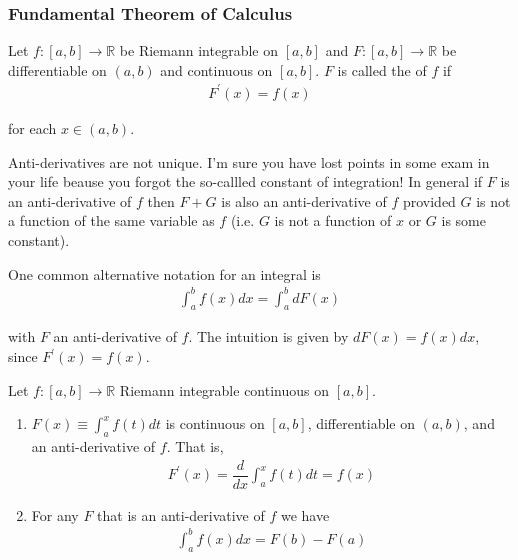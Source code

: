 \documentclass{article}
\begin{document}
\subsubsection{Fundamental Theorem of Calculus}
\label{ssub:fundamental_theorem_of_calculus}

\begin{definition}
  Let $f: [a, b] \to \mathbb{R}$ be Riemann integrable on $[a, b]$ and $F: [a, b] \to \mathbb{R}$ be differentiable on $(a, b)$ and continuous on $[a, b]$. $F$ is called the  of $f$ if
  \begin{align*}
    F^{\prime}(x) = f(x)
  \end{align*}

  for each $x \in (a, b)$.
\end{definition}

\begin{remark}
  Anti-derivatives are not unique. I'm sure you have lost points in some exam in your life beause you forgot the so-callled constant of integration! In general if $F$ is an anti-derivative of $f$ then $F + G$ is also an anti-derivative of $f$ provided $G$ is not a function of the same variable as $f$ (i.e. $G$ is not a function of $x$ or $G$ is some constant).
\end{remark}

\begin{remark}
  One common alternative notation for an integral is
  \begin{align*}
    \int_{a}^{b} f(x) dx
    =
    \int_{a}^{b} dF(x)
  \end{align*}

  with $F$ an anti-derivative of $f$. The intuition is given by $dF(x) = f(x) dx$, since $F^\prime(x) = f(x)$.
\end{remark}

\begin{theorem}
  Let $f: [a, b] \to \mathbb{R}$ Riemann integrable continuous on $[a, b]$.
  \begin{enumerate}
    \item $F(x) \equiv \displaystyle\int_a^x f(t) dt$ is continuous on $[a, b]$, differentiable on $(a, b)$, and an anti-derivative of $f$. That is,
      \begin{align*}
        F^{\prime}(x) = \dfrac{d}{dx} \int_{a}^{x} f(t) dt = f(x)
      \end{align*}

    \item For any $F$ that is an anti-derivative of $f$ we have
      \begin{align*}
        \int_{a}^{b} f(x) dx = F(b) - F(a)
      \end{align*}
  \end{enumerate}
\end{theorem}
\end{document}
